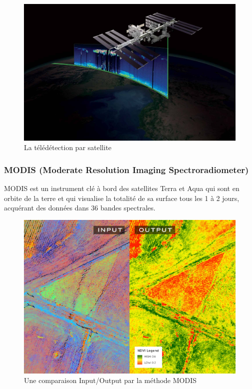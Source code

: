 \documentclass[12pt, openany]{report}
\begin{document}
\begin{figure}[hp]
\centering
\includegraphics[scale=0.15]{tele.jpg}
\caption{La télédétection par satellite}
\end{figure}

\newpage
\subsubsection{MODIS (Moderate Resolution Imaging Spectroradiometer)}
MODIS est un instrument clé à bord des satellites Terra et Aqua qui sont en orbite de la terre et qui visualise la totalité de sa surface tous les 1 à 2 jours, acquérant des données dans 36 bandes spectrales.

\begin{figure}[hp]
\centering
\includegraphics[scale=0.4]{modis.png}
\caption{Une comparaison Input/Output par la méthode MODIS}
\end{figure}
\end{document}
